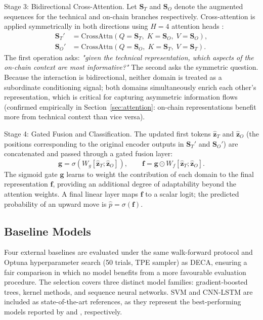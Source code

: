 \documentclass[final,3p,times,authoryear]{elsarticle}
\begin{document}
\noindent Stage 3: Bidirectional Cross-Attention.
Let $\mathbf{S}_T$ and $\mathbf{S}_O$ denote the augmented sequences
for the technical and on-chain branches respectively.
Cross-attention is applied symmetrically in both directions using
$H=4$ attention heads \citep{vaswani2017attention}:
\begin{align}
  \mathbf{S}_T' &= \mathrm{CrossAttn}(Q\!=\!\mathbf{S}_T,\;
                                      K\!=\!\mathbf{S}_O,\;
                                      V\!=\!\mathbf{S}_O),\\
  \mathbf{S}_O' &= \mathrm{CrossAttn}(Q\!=\!\mathbf{S}_O,\;
                                      K\!=\!\mathbf{S}_T,\;
                                      V\!=\!\mathbf{S}_T).
\end{align}
The first operation asks: \emph{"given the technical representation,
which aspects of the on-chain context are most informative?"}
The second asks the symmetric question.
Because the interaction is bidirectional, neither domain is treated as
a subordinate conditioning signal; both domains simultaneously enrich
each other's representation, which is critical for capturing
asymmetric information flows (confirmed empirically in
Section~\ref{sec:attention}: on-chain representations benefit more
from technical context than vice versa).

\noindent Stage 4: Gated Fusion and Classification.
The updated first tokens $\hat{\mathbf{z}}_T$ and $\hat{\mathbf{z}}_O$
(the positions corresponding to the original encoder outputs in
$\mathbf{S}_T'$ and $\mathbf{S}_O'$) are concatenated and passed
through a gated fusion layer:
\begin{equation}
  \mathbf{g} = \sigma\!\left(W_g[\hat{\mathbf{z}}_T;\hat{\mathbf{z}}_O]\right),
  \qquad
  \mathbf{f} = \mathbf{g} \odot W_f[\hat{\mathbf{z}}_T;\hat{\mathbf{z}}_O].
\end{equation}
The sigmoid gate $\mathbf{g}$ learns to weight the contribution of
each domain to the final representation $\mathbf{f}$, providing an
additional degree of adaptability beyond the attention weights.
A final linear layer maps $\mathbf{f}$ to a scalar logit; the
predicted probability of an upward move is $\hat{p} = \sigma(\mathbf{f})$.

\subsection{Baseline Models}

Four external baselines are evaluated under the same walk-forward
protocol and Optuna hyperparameter search (50 trials, TPE sampler)
as DECA, ensuring a fair comparison in which no model benefits from
a more favourable evaluation procedure.
The selection covers three distinct model families: gradient-boosted
trees, kernel methods, and sequence neural networks.
SVM and CNN-LSTM are included as state-of-the-art references, as they
represent the best-performing models reported by \citet{omole2025eaai}
and \citet{omole2024financial}, respectively.
\end{document}

